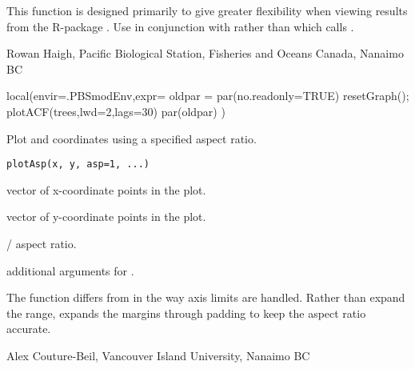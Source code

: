 \documentclass[letterpaper]{book}
\begin{document}
%
\begin{Details}\relax
This function is designed primarily to give greater flexibility when viewing 
results from the R-package . Use  in conjunction with 
 rather than  
which calls .
\end{Details}
%
\begin{Author}\relax
Rowan Haigh, Pacific Biological Station, Fisheries and Oceans Canada, Nanaimo BC
\end{Author}
%
\begin{Examples}
\begin{ExampleCode}
local(envir=.PBSmodEnv,expr={
  oldpar = par(no.readonly=TRUE)
  resetGraph(); plotACF(trees,lwd=2,lags=30)
  par(oldpar)
})
\end{ExampleCode}
\end{Examples}
%
\begin{Description}\relax
Plot  and  coordinates using a specified aspect ratio.
\end{Description}
%
\begin{Usage}
\begin{verbatim}
plotAsp(x, y, asp=1, ...)
\end{verbatim}
\end{Usage}
%
\begin{Arguments}
\begin{ldescription}
\item[\code{x}] vector of x-coordinate points in the plot.
\item[\code{y}] vector of y-coordinate points in the plot.
\item[\code{asp}] / aspect ratio.
\item[\code{...}] additional arguments for .
\end{ldescription}
\end{Arguments}
%
\begin{Details}\relax
The function  differs from  in the way axis 
limits are handled. Rather than expand the range,  expands the 
margins through padding to keep the aspect ratio accurate.
\end{Details}
%
\begin{Author}\relax
Alex Couture-Beil, Vancouver Island University, Nanaimo BC
\end{Author}
\end{document}
